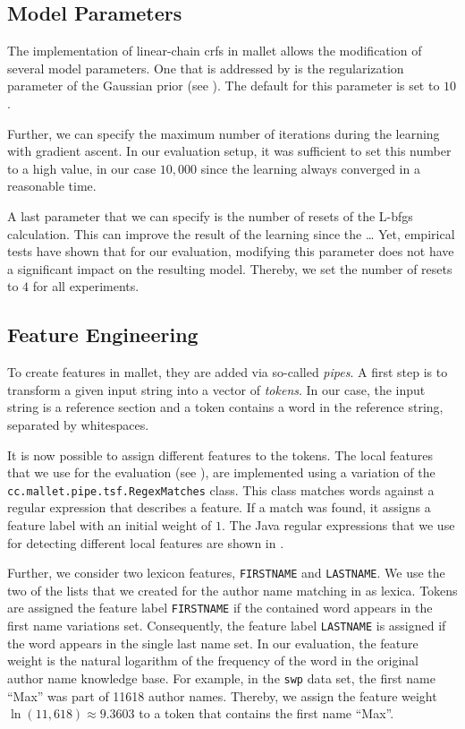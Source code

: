 \subsection{Model Parameters}\label{subsec:i-model-parameters}

The implementation of \glspl{linear-chain crf} in \gls{mallet} allows the modification of several model parameters.
One that is addressed by  is the regularization parameter of the Gaussian prior (see ).
The default for this parameter is set to $10$.

Further, we can specify the maximum number of iterations during the learning with gradient ascent.
In our evaluation setup, it was sufficient to set this number to a high value, in our case $10,000$ since the learning always converged in a reasonable time.

A last parameter that we can specify is the number of resets of the L-\gls{bfgs} calculation.
This can improve the result of the learning since the \dots{}
Yet, empirical tests have shown that for our evaluation, modifying this parameter does not have a significant impact on the resulting model.
Thereby, we set the number of resets to $4$ for all experiments.

\subsection{Feature Engineering}\label{subsec:i-feature-engineering}

To create features in \gls{mallet}, they are added via so-called \textit{pipes}.
A first step is to transform a given input string into a vector of \textit{tokens}.
In our case, the input string is a reference section and a token contains a word in the reference string, separated by whitespaces.

It is now possible to assign different features to the tokens.
The local features that we use for the evaluation (see ), are implemented using a variation of the \texttt{cc.mallet.pipe.tsf.RegexMatches} class.
This class matches words against a regular expression that describes a feature.
If a match was found, it assigns a feature label with an initial weight of $1$.
The Java regular expressions that we use for detecting different local features are shown in .

Further, we consider two lexicon features, \texttt{FIRSTNAME} and \texttt{LASTNAME}.
We use the two of the lists that we created for the author name matching in  as lexica.
Tokens are assigned the feature label \texttt{FIRSTNAME} if the contained word appears in the first name variations set.
  Consequently, the feature label \texttt{LASTNAME} is assigned if the word appears in the single last name set.
In our evaluation, the feature weight is the natural logarithm of the frequency of the word in the original author name knowledge base.
For example, in the \texttt{swp} data set, the first name ``Max'' was part of \num{11618} author names.
Thereby, we assign the feature weight $\ln(11,618)\approx9.3603$ to a token that contains the first name ``Max''.

